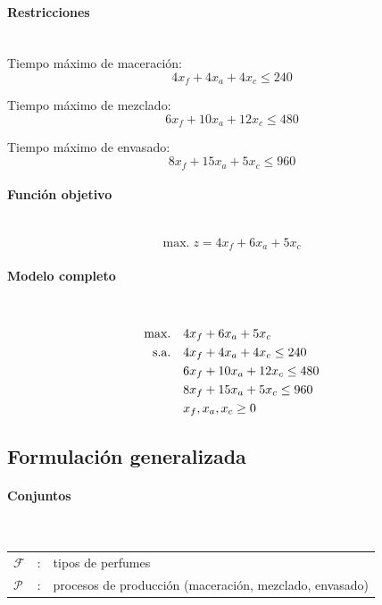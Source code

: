 \paragraph{Restricciones}\mbox{}\\

Tiempo máximo de maceración:
\begin{equation}
4x_f + 4x_a + 4x_c \leq 240
\end{equation}

Tiempo máximo de mezclado:
\begin{equation}
6x_f + 10x_a + 12x_c \leq 480
\end{equation}

Tiempo máximo de envasado:
\begin{equation}
8x_f + 15x_a + 5x_c \leq 960
\end{equation}

\paragraph{Función objetivo}\mbox{}\\
\begin{equation}
\mbox{max.}\; z = 4x_f + 6x_a + 5x_c
\end{equation}

\paragraph{Modelo completo}\mbox{}\\
\begin{align}
\mbox{max.}\quad & 4x_f + 6x_a + 5x_c \notag \\
\mbox{s.a.}\quad
& 4x_f + 4x_a + 4x_c \leq 240 \notag \\
& 6x_f + 10x_a + 12x_c \leq 480 \notag \\
& 8x_f + 15x_a + 5x_c \leq 960 \notag \\
& x_f, x_a, x_c \geq 0
\end{align}

\subsection{Formulación generalizada}

\paragraph{Conjuntos}\mbox{}\\
\begin{tabular}{lcl}
$\mathcal{F}$ & : & tipos de perfumes \\
$\mathcal{P}$ & : & procesos de producción (maceración, mezclado, envasado) \\
\end{tabular}

